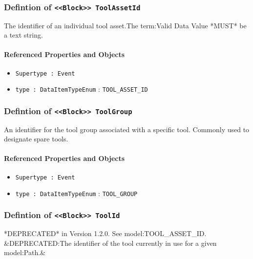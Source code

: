 \subsubsection{Defintion of \texttt{<<Block>> ToolAssetId}}
  \label{type:ToolAssetId}

\FloatBarrier

The identifier of an individual tool asset.The {term:Valid Data Value} *MUST* be a text string.

\FloatBarrier
\paragraph{Referenced Properties and Objects}

\begin{itemize}
\item \texttt{Supertype : Event}

\item \texttt{type : DataItemTypeEnum} : \texttt{TOOL_ASSET_ID}

\end{itemize}
\FloatBarrier
\subsubsection{Defintion of \texttt{<<Block>> ToolGroup}}
  \label{type:ToolGroup}

\FloatBarrier

An identifier for the tool group associated with a specific tool. Commonly used to designate spare tools.

\FloatBarrier
\paragraph{Referenced Properties and Objects}

\begin{itemize}
\item \texttt{Supertype : Event}

\item \texttt{type : DataItemTypeEnum} : \texttt{TOOL_GROUP}

\end{itemize}
\FloatBarrier
\subsubsection{Defintion of \texttt{<<Block>> ToolId}}
  \label{type:ToolId}

\FloatBarrier

*DEPRECATED* in Version 1.2.0.   See {model:TOOL_ASSET_ID}. &DEPRECATED:The identifier of the tool currently in use for a given {model:Path}.&

